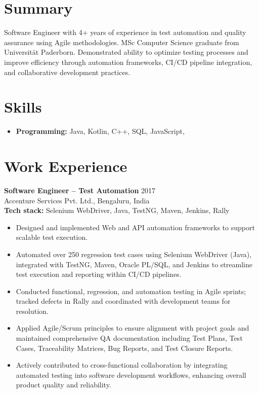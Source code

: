 \documentclass[10pt]{article}   %
\begin{document}
\begin{minipage}[t]{0.67\textwidth}
\vspace*{0pt}
\section*{Summary}
Software Engineer with 4+ years of experience in test automation and quality assurance using Agile methodologies. MSc Computer Science graduate from Universität Paderborn. Demonstrated ability to optimize testing processes and improve efficiency through automation frameworks, CI/CD pipeline integration, and collaborative development practices.\\




\section*{Skills}
\begin{itemize}[leftmargin=0.15in, label={}]
    \item{
     \textbf{Programming:} Java, Kotlin, C++, SQL, JavaScript, \\
    }
\end{itemize}
\section*{Work Experience}
\textbf{Software Engineer – Test Automation} \hfill 2017\\
Accenture Services Pvt. Ltd., Bengaluru, India \\
\textbf{Tech stack:} Selenium WebDriver, Java, TestNG, Maven, Jenkins, Rally
\begin{itemize}[leftmargin=*, topsep=2pt, itemsep=1pt, parsep=0pt]
\item Designed and implemented Web and API automation frameworks to support scalable test execution.
\item Automated over 250 regression test cases using Selenium WebDriver (Java), integrated with TestNG, Maven, Oracle PL/SQL, and Jenkins to streamline test execution and reporting within CI/CD pipelines.
\item Conducted functional, regression, and automation testing in Agile sprints; tracked defects in Rally and coordinated with development teams for resolution.
\item Applied Agile/Scrum principles to ensure alignment with project goals and maintained comprehensive QA documentation including Test Plans, Test Cases, Traceability Matrices, Bug Reports, and Test Closure Reports.
\item Actively contributed to cross-functional collaboration by integrating automated testing into software development workflows, enhancing overall product quality and reliability.
\end{itemize}


\end{minipage}
\end{document}
